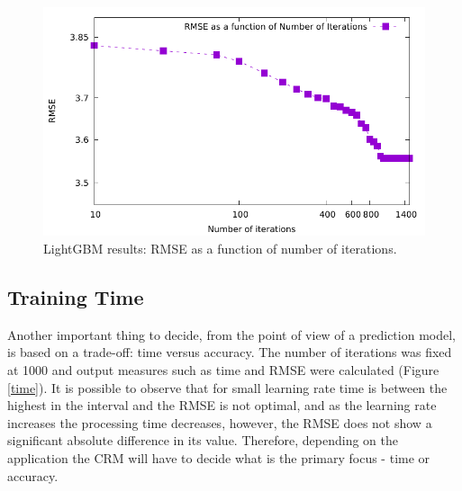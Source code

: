 \documentclass[letterpaper, 10 pt, conference]{ieeeconf}  %
\begin{document}
\begin{figure}[thpb]
\centering
\includegraphics[scale=0.7]{Figures/numinteractions_rmse_lgbm.pdf}
\caption{LightGBM results: RMSE as a function of number of iterations.}
\label{number_iterations}
\end{figure}


\subsection{Training Time}
Another important thing to decide, from the point of view of a prediction model, is based on a trade-off: time versus accuracy. The number of iterations was fixed at 1000 and output measures such as time and RMSE were calculated (Figure \ref{time}). It is possible to observe that for small learning rate time is between the highest in the interval and the RMSE is not optimal, and as the learning rate increases the processing time decreases, however, the RMSE does not show a significant absolute difference in its value. Therefore, depending on the application the CRM will have to decide what is the primary focus - time or accuracy.
\end{document}
